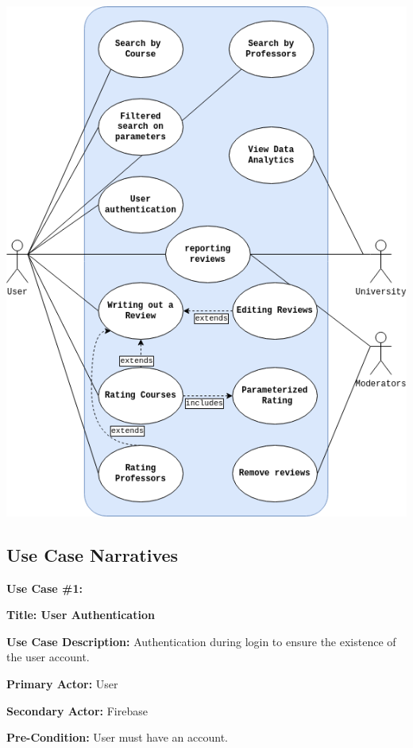 \documentclass{article}
\begin{document}
\begin{center}
	\includegraphics[scale=0.5]{../../Milestone_1/requirements_specification/USECASE.drawio.png}	
\end{center}



\subsection{Use Case Narratives}

\textbf{Use Case \#1: }
	
\quad \textbf{Title: User Authentication}

\quad\textbf{Use Case Description:}
Authentication during login to ensure the existence of the user account.
	
\quad\textbf{Primary Actor:} User
	
\quad\textbf{Secondary Actor:} Firebase
	
\quad\textbf{Pre-Condition:} User must have an account.
	
\end{document}
